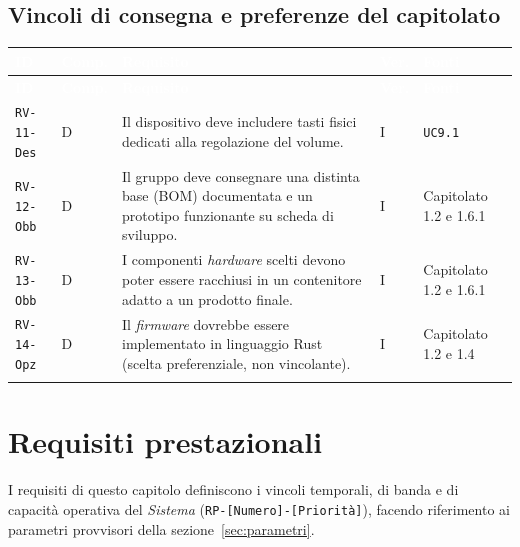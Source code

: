 \documentclass[12pt,a4paper]{article}
\newcommand{\thc}[1]{\textcolor{white}{\textbf{#1}}}
\newcommand{\rl}{\\ \arrayrulecolor{bfline}\hline}
\begin{document}
\subsection{Vincoli di consegna e preferenze del capitolato}
\begin{longtable}{>{\raggedright\arraybackslash}p{}>{\centering\arraybackslash}p{}>{\raggedright\arraybackslash}p{}>{\centering\arraybackslash}p{}>{\raggedright\arraybackslash}p{}}
\rowcolor{bfblue}\thc{ID} & \thc{Comp.} & \thc{Requisito} & \thc{Ver.} & \thc{Fonti} \\ \endfirsthead
\rowcolor{bfblue}\thc{ID} & \thc{Comp.} & \thc{Requisito} & \thc{Ver.} & \thc{Fonti} \\ \endhead
\texttt{RV-11-Des} & D & Il dispositivo deve includere tasti fisici dedicati alla regolazione del volume. & I & \texttt{UC9.1} \rl

\texttt{RV-12-Obb} & D & Il gruppo deve consegnare una distinta base (BOM) documentata e un prototipo funzionante su scheda di sviluppo. & I & Capitolato 1.2 e 1.6.1 \rl

\texttt{RV-13-Obb} & D & I componenti \emph{hardware} scelti devono poter essere racchiusi in un contenitore adatto a un prodotto finale. & I & Capitolato 1.2 e 1.6.1 \rl

\texttt{RV-14-Opz} & D & Il \emph{firmware} dovrebbe essere implementato in linguaggio Rust (scelta preferenziale, non vincolante). & I & Capitolato 1.2 e 1.4 \rl

\end{longtable}

\section{Requisiti prestazionali}
I requisiti di questo capitolo definiscono i vincoli temporali, di banda e di capacità operativa del \emph{Sistema} (\texttt{RP-[Numero]-[Priorità]}), facendo riferimento ai parametri provvisori della sezione~\ref{sec:parametri}.
\end{document}
